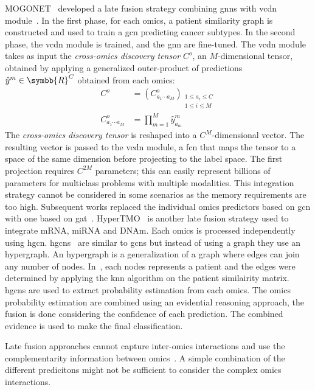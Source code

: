 \documentclass[../main.tex]{subfiles}
\begin{document}
	    MOGONET~\cite{MOGONET} developed a late fusion strategy combining \glspl{gnn} with \gls{vcdn} module~\cite{VCDN}.
	    In the first phase, for each omics, a patient similarity graph is constructed and used to train a \gls{gcn} predicting cancer subtypes.
	    In the second phase, the \gls{vcdn} module is trained, and the \gls{gnn} are fine-tuned.
	    The \gls{vcdn} module takes as input the \emph{cross-omics discovery tensor} \(C^{o}\), an \(M\)-dimensional tensor, obtained by applying a generalized outer-product of predictions \(\hat{y}^{m} \in \symbb{R}^{C}\) obtained from each omics:
	    \begin{align*}
	        C^{o}                     & = {\left(C^{o}_{a_{1}\cdots a_{M}}\right)}_{\substack{1 \leq a_{i} \leq C \\ 1 \leq i \leq M}} \\
	        C^{o}_{a_{1}\cdots a_{M}} & = \prod_{m=1}^{M}\hat{y}_{a_{m}}^{m}
	    \end{align*}
	    The \emph{cross-omics discovery tensor} is reshaped into a \(C^{M}\)-dimensional vector.
	    The resulting vector is passed to the \gls{vcdn} module, a \gls{fcn} that maps the tensor to a space of the same dimension before projecting to the label space.
	    The first projection requires \(C^{2M}\) parameters; this can easily represent billions of parameters for multiclass problems with multiple modalities.
	    This integration strategy cannot be considered in some scenarios as the memory requirements are too high.
	    Subsequent works replaced the individual omics predictors based on \gls{gcn} with one based on \gls{gat}~\cite{MODILM,Leng2022}.
	    HyperTMO~\cite{Wang2024} is another late fusion strategy used to integrate mRNA, miRNA and DNAm.
	    Each omics is processed independently using \gls{hgcn}.
	    \Glspl{hgcn}~\cite{Feng2019} are similar to \glspl{gcn} but instead of using a graph they use an hypergraph.
	    An hypergraph is a generalization of a graph where edges can join any number of nodes.
	    In~\cite{Wang2024}, each nodes represents a patient and the edges were determined by applying the \gls{knn} algorithm on the patient similairity matrix.
	    \Glspl{hgcn} are used to extract probability estimation from each omics.
	    The omics probability estimation are combined using an evidential reasoning approach, the fusion is done considering the confidence of each prediction.
	    The combined evidence is used to make the final classification.

	    Late fusion approaches cannot capture inter-omics interactions and use the complementarity information between omics~\cite{Picard2021}.
	    A simple combination of the different predicitons might not be sufficient to consider the complex omics interactions.
\end{document}
